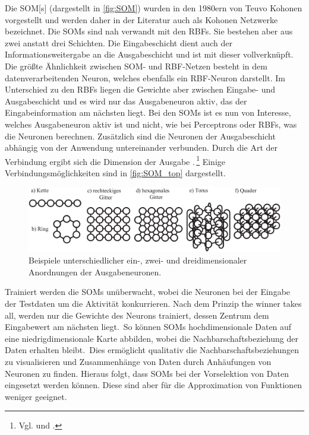 Die \gls{SOM}[s] (dargestellt in \autoref{fig:SOM}) wurden in den 1980ern von Teuvo Kohonen vorgestellt und werden daher in der Literatur auch als Kohonen Netzwerke bezeichnet. Die SOMs sind nah verwandt mit den RBFs. Sie bestehen aber aus zwei anstatt drei Schichten. Die Eingabeschicht dient auch der Informationsweitergabe an die Ausgabeschicht und ist mit dieser vollverknüpft. Die größte Ähnlichkeit zwischen SOM- und RBF-Netzen besteht in dem datenverarbeitenden Neuron, welches ebenfalls ein RBF-Neuron darstellt. Im Unterschied zu den RBFs liegen die Gewichte aber zwischen Eingabe- und Ausgabeschicht und es wird nur das Ausgabeneuron aktiv, das der Eingabeinformation am nächsten liegt.
Bei den SOMs ist es nun von Interesse, welches Ausgabeneuron aktiv ist und nicht, wie bei Perceptrons oder RBFs, was die Neuronen berechnen. Zusätzlich sind die Neuronen der Ausgabeschicht abhängig von der Anwendung untereinander verbunden. Durch die Art der Verbindung ergibt sich die Dimension der Ausgabe .\,\footnote{Vgl. \citet[102 ff]{Kruse15} und \citet[153 ff]{dkriesel07}.} Einige Verbindungsmöglichkeiten sind in \autoref{fig:SOM_top} dargestellt.
\begin{figure}[tb]
    \centering
        \includegraphics[width=1\textwidth]{Bilder/Netzwerke/som_top.png}
    \caption[Unterschiedliche Anordnungen der Ausgabeneuronen von SOMs]{Beispiele unterschiedlicher ein-, zwei- und dreidimensionaler Anordnungen der Ausgabeneuronen.\,\protect\footnotemark{}}
    \label{fig:SOM_top}
\end{figure}
\addtocounter{footnote}{-1}     %
\addtocounter{Hfootnote}{-1}    %
\wrapfigfoot{}

Trainiert werden die SOMs unüberwacht, wobei die Neuronen bei der Eingabe der Testdaten um die Aktivität konkurrieren. Nach dem Prinzip \glqq the winner takes all\grqq, werden nur die Gewichte des Neurons trainiert, dessen Zentrum dem Eingabewert am nächsten liegt.\,
So können SOMs hochdimensionale Daten auf eine niedrigdimensionale Karte abbilden, wobei die Nachbarschaftsbeziehung der Daten erhalten bleibt.\, Dies ermöglicht qualitativ die Nachbarschaftsbeziehungen zu visualisieren und Zusammenhänge von Daten durch Anhäufungen von Neuronen zu finden. Hieraus folgt, dass SOMs bei der Vorselektion von Daten eingesetzt werden können. Diese sind aber für die Approximation von Funktionen weniger geeignet.

